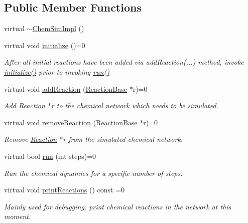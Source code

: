 \subsection*{Public Member Functions}
\begin{DoxyCompactItemize}
\item 
virtual \hyperlink{classchem_1_1ChemSimImpl_a54ce9889cf7a09275d2c8257557a5be1}{$\sim$\-Chem\-Sim\-Impl} ()
\item 
virtual void \hyperlink{classchem_1_1ChemSimImpl_a250b43230ac66832bbcecf4f630f2fbc}{initialize} ()=0
\begin{DoxyCompactList}\small\item\em After all initial reactions have been added via add\-Reaction(...) method, invoke \hyperlink{classchem_1_1ChemSimImpl_a250b43230ac66832bbcecf4f630f2fbc}{initialize()} prior to invoking \hyperlink{classchem_1_1ChemSimImpl_a9f051e00a754fdd76d5e2b3a217f3a49}{run()} \end{DoxyCompactList}\item 
virtual void \hyperlink{classchem_1_1ChemSimImpl_a2a9ea4429bf00103d923556559012944}{add\-Reaction} (\hyperlink{classchem_1_1ReactionBase}{Reaction\-Base} $\ast$r)=0
\begin{DoxyCompactList}\small\item\em Add \hyperlink{classchem_1_1Reaction}{Reaction} $\ast$r to the chemical network which needs to be simulated. \end{DoxyCompactList}\item 
virtual void \hyperlink{classchem_1_1ChemSimImpl_a8a732fedbcb6ae7c5d4d4cec2b540148}{remove\-Reaction} (\hyperlink{classchem_1_1ReactionBase}{Reaction\-Base} $\ast$r)=0
\begin{DoxyCompactList}\small\item\em Remove \hyperlink{classchem_1_1Reaction}{Reaction} $\ast$r from the simulated chemical network. \end{DoxyCompactList}\item 
virtual bool \hyperlink{classchem_1_1ChemSimImpl_a9f051e00a754fdd76d5e2b3a217f3a49}{run} (int steps)=0
\begin{DoxyCompactList}\small\item\em Run the chemical dynamics for a specific number of steps. \end{DoxyCompactList}\item 
virtual void \hyperlink{classchem_1_1ChemSimImpl_a24291dac40633358ab6a9f473d6f861d}{print\-Reactions} () const =0
\begin{DoxyCompactList}\small\item\em Mainly used for debugging\-: print chemical reactions in the network at this moment. \end{DoxyCompactList}\end{DoxyCompactItemize}


